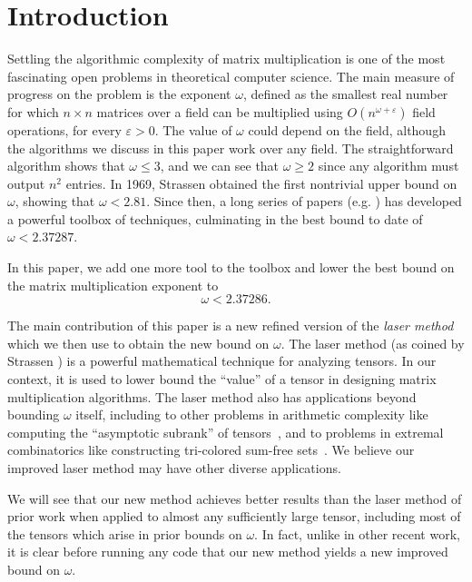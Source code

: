 \PassOptionsToPackage{shortlabels}{enumitem}\documentclass[10pt,a4paper]{article}
\newcommand{\eps}{\varepsilon}
\begin{document}
\section{Introduction}
Settling the algorithmic complexity of matrix multiplication is one of the most fascinating open problems in theoretical computer science. The main measure of progress on the problem is the exponent $\omega$, defined as the smallest real number for which $n\times n$ matrices over a field can be multiplied using $O(n^{\omega+\eps})$ field operations, for every $\eps>0$. The value of $\omega$ could depend on the field, although the algorithms we discuss in this paper work over any field.
The straightforward algorithm shows that $\omega\leq 3$, and we can see that $\omega\geq 2$ since any algorithm must output $n^2$ entries. In 1969, Strassen \cite{strassen} obtained the first nontrivial upper bound on $\omega$, showing that $\omega<2.81$. Since then, a long series of papers (e.g. \cite{Pan78,BCRL79,Pan80,Sch81,Romani82,cw81as,laser,coppersmith,stothers,v12,legall,cohn2003group,cohn2005group,cohn2013fast}) has developed a powerful toolbox of techniques, culminating in the best bound to date of $\omega<2.37287$.

In this paper, we add one more tool to the toolbox and lower the best bound on the matrix multiplication exponent to $$\omega<2.37286.$$ 

The main contribution of this paper is a new refined version of the {\em laser method} which we then use to obtain the new bound on $\omega$. The laser method (as coined by Strassen \cite{laser}) is a powerful mathematical technique for analyzing tensors. In our context, it is used to lower bound the ``value'' of a tensor in designing matrix multiplication algorithms. The laser method also has applications beyond bounding $\omega$ itself, including to other problems in arithmetic complexity like computing the ``asymptotic subrank'' of tensors~\cite{Alman19}, and to problems in extremal combinatorics like constructing tri-colored sum-free sets~\cite{kleinberg}. We believe our improved laser method may have other diverse applications.

We will see that our new method achieves better results than the laser method of prior work when applied to almost any sufficiently large tensor, including most of the tensors which arise in prior bounds on $\omega$. In fact, unlike in other recent work, it is clear before running any code that our new method yields a new improved bound on $\omega$.
\end{document}
